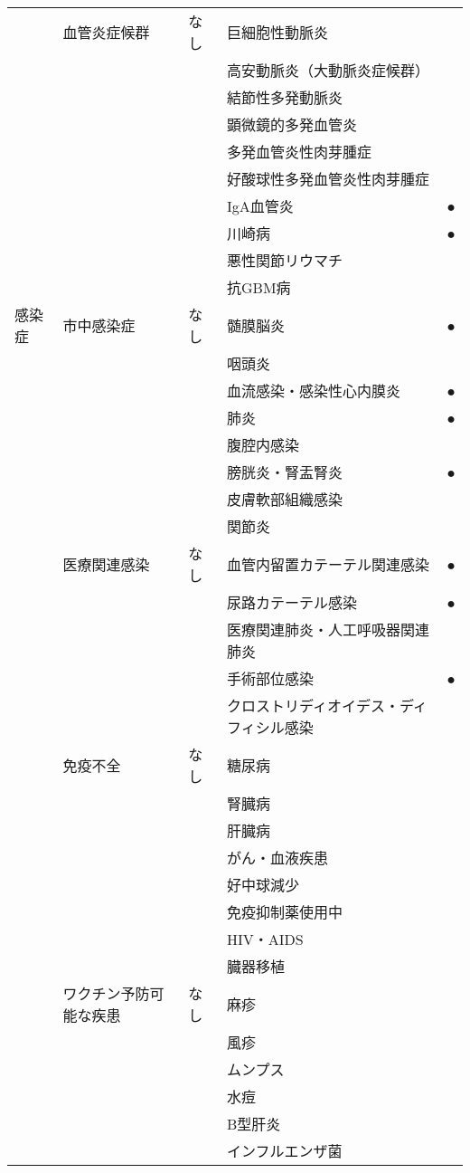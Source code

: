 \begin{xltabular}{\linewidth}{XXXXX}
 & 血管炎症候群 & なし & 巨細胞性動脈炎 &  \\
 &  &  & 高安動脈炎（大動脈炎症候群） &  \\
 &  &  & 結節性多発動脈炎 &  \\
 &  &  & 顕微鏡的多発血管炎 &  \\
 &  &  & 多発血管炎性肉芽腫症 &  \\
 &  &  & 好酸球性多発血管炎性肉芽腫症 &  \\
 &  &  & IgA血管炎 & ● \\
 &  &  & 川崎病 & ● \\
 &  &  & 悪性関節リウマチ &  \\
 &  &  & 抗GBM病 &  \\
感染症 & 市中感染症 & なし & 髄膜脳炎 & ● \\
 &  &  & 咽頭炎 &  \\
 &  &  & 血流感染・感染性心内膜炎 & ● \\
 &  &  & 肺炎 & ● \\
 &  &  & 腹腔内感染 &  \\
 &  &  & 膀胱炎・腎盂腎炎 & ● \\
 &  &  & 皮膚軟部組織感染 &  \\
 &  &  & 関節炎 &  \\
 & 医療関連感染 & なし & 血管内留置カテーテル関連感染 & ● \\
 &  &  & 尿路カテーテル感染 & ● \\
 &  &  & 医療関連肺炎・人工呼吸器関連肺炎 &  \\
 &  &  & 手術部位感染 & ● \\
 &  &  & クロストリディオイデス・ディフィシル感染 &  \\
 & 免疫不全 & なし & 糖尿病 &  \\
 &  &  & 腎臓病 &  \\
 &  &  & 肝臓病 &  \\
 &  &  & がん・血液疾患 &  \\
 &  &  & 好中球減少 &  \\
 &  &  & 免疫抑制薬使用中 &  \\
 &  &  & HIV・AIDS &  \\
 &  &  & 臓器移植 &  \\
 & ワクチン予防可能な疾患 & なし & 麻疹 &  \\
 &  &  & 風疹 &  \\
 &  &  & ムンプス &  \\
 &  &  & 水痘 &  \\
 &  &  & B型肝炎 &  \\
 &  &  & インフルエンザ菌 &  \\

\end{xltabular}
